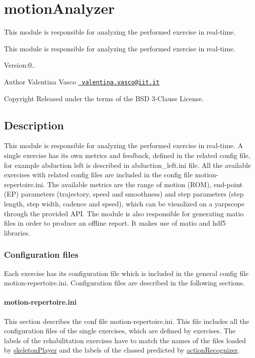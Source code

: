 \section{motion\+Analyzer}
\label{group__motionAnalyzer}


This module is responsible for analyzing the performed exercise in real-\/time.  


This module is responsible for analyzing the performed exercise in real-\/time. 

Version\+:0.. \begin{DoxyAuthor}{Author}
Valentina Vasco \href{mailto:valentina.vasco@iit.it}{\texttt{ valentina.\+vasco@iit.\+it}} ~\newline
 
\end{DoxyAuthor}
\begin{DoxyCopyright}{Copyright}
Released under the terms of the B\+SD 3-\/Clause License. 
\end{DoxyCopyright}
\hypertarget{group__skeletonViewer_intro_sec}{}\subsection{Description}\label{group__skeletonViewer_intro_sec}
This module is responsible for analyzing the performed exercise in real-\/time. A single exercise has its own metrics and feedback, defined in the related config file, for example abduction left is described in {\ttfamily abduction\+\_\+left.\+ini} file. All the available exercises with related config files are included in the config file {\ttfamily motion-\/repertoire.\+ini}. The available metrics are the range of motion (R\+OM), end-\/point (EP) parameters (trajectory, speed and smoothness) and step parameters (step length, step width, cadence and speed), which can be visualized on a yarpscope through the provided A\+PI. The module is also responsible for generating matio files in order to produce an offline report. It makes use of matio and hdf5 libraries.\hypertarget{group__motionAnalyzer_sec-conf}{}\subsubsection{Configuration files}\label{group__motionAnalyzer_sec-conf}
Each exercise has its configuration file which is included in the general config file motion-\/repertoire.\+ini. Configuration files are described in the following sections.\hypertarget{group__motionAnalyzer_sec-motion-rep}{}\paragraph{motion-\/repertoire.\+ini}\label{group__motionAnalyzer_sec-motion-rep}
This section describes the conf file motion-\/repertoire.\+ini. This file includes all the configuration files of the single exercises, which are defined by {\ttfamily exercises}. The labels of the {\ttfamily rehabilitation} exercises have to match the names of the files loaded by \mbox{\hyperlink{group__skeletonPlayer}{skeleton\+Player}} and the labels of the classed predicted by \mbox{\hyperlink{group__actionRecognizer}{action\+Recognizer}}.

